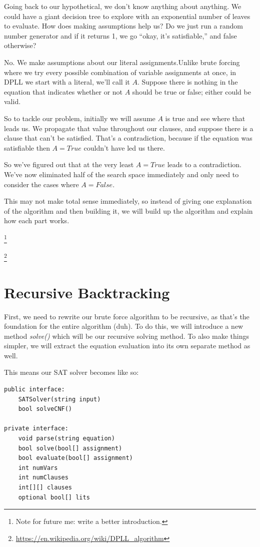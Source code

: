\documentclass[../main.tex]{subfiles}
\begin{document}
Going back to our hypothetical, we don't know anything about anything. We
could have a giant decision tree to explore with an exponential number of leaves
to evaluate. How does making assumptions help us? Do we just run a random number generator 
and if it returns 1, we go ``okay, it's satisfiable,'' and false otherwise?

No. We make assumptions about our literal assignments.Unlike brute forcing where we try 
every possible combination of variable assignments at once, in DPLL we start with a literal, 
we'll call it $A$. Suppose there is nothing in the equation that indicates whether or not 
$A$ should be true or false; either could be valid.

So to tackle our problem, initially we will assume $A$ is true and see where
that leads us. We propagate that value throughout our clauses, and suppose
there is a clause that can't be satisfied. That's a contradiction, because if the
equation was satisfiable then $A = True$ couldn't have led us there.

So we've figured out that at the very least $A = True$ leads to a
contradiction. We've now eliminated half of the search space immediately and only need to
consider the cases where $A = False$.

This may not make total sense immediately, so instead of giving one explanation
of the algorithm and then building it, we will build up the algorithm and explain
how each part works.

\footnote{Note for future me: write a better introduction.}

\footnote{\url{https://en.wikipedia.org/wiki/DPLL_algorithm}}

\section{Recursive Backtracking}

First, we need to rewrite our brute force algorithm to be recursive, as that's
the foundation for the entire algorithm (duh). To do this, we will introduce a
new method \textit{solve()} which will be our recursive solving method. To
also make things simpler, we will extract the equation evaluation into its own
separate method as well.

This means our SAT solver becomes like so:

\begin{lstlisting}
public interface:
    SATSolver(string input)
    bool solveCNF()

private interface:
    void parse(string equation)
    bool solve(bool[] assignment)
    bool evaluate(bool[] assignment)
    int numVars
    int numClauses
    int[][] clauses
    optional bool[] lits
\end{lstlisting}
\end{document}
